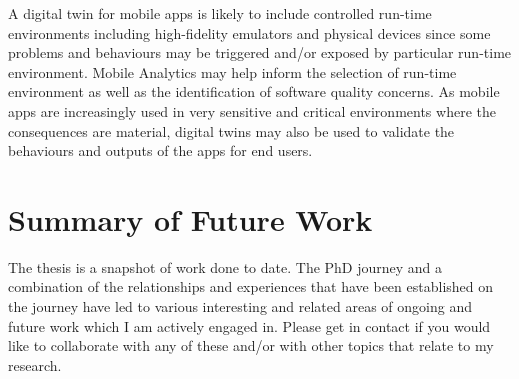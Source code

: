 A digital twin for mobile apps is likely to include controlled run-time environments including high-fidelity emulators and physical devices since some problems and behaviours may be triggered and/or exposed by particular run-time environment. Mobile Analytics may help inform the selection of run-time environment as well as the identification of software quality concerns. As mobile apps are increasingly used in very sensitive and critical environments where the consequences are material, digital twins may also be used to validate the behaviours and outputs of the apps for end users.


\section{Summary of Future Work}
The thesis is a snapshot of work done to date. The PhD journey and a combination of the relationships and experiences that have been established on the journey have led to various interesting and related areas of ongoing and future work which I am actively engaged in. Please get in contact if you would like to collaborate with any of these and/or with other topics that relate to my research.
